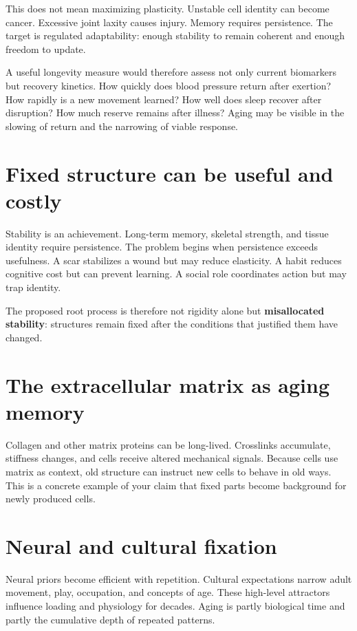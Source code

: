 This does not mean maximizing plasticity. Unstable cell identity can become cancer. Excessive joint laxity causes injury. Memory requires persistence. The target is regulated adaptability: enough stability to remain coherent and enough freedom to update.

A useful longevity measure would therefore assess not only current biomarkers but recovery kinetics. How quickly does blood pressure return after exertion? How rapidly is a new movement learned? How well does sleep recover after disruption? How much reserve remains after illness? Aging may be visible in the slowing of return and the narrowing of viable response.

\section{Fixed structure can be useful and costly}\label{fixed-structure-can-be-useful-and-costly}

Stability is an achievement. Long-term memory, skeletal strength, and tissue identity require persistence. The problem begins when persistence exceeds usefulness. A scar stabilizes a wound but may reduce elasticity. A habit reduces cognitive cost but can prevent learning. A social role coordinates action but may trap identity.

The proposed root process is therefore not rigidity alone but \textbf{misallocated stability}: structures remain fixed after the conditions that justified them have changed.

\section{The extracellular matrix as aging memory}\label{the-extracellular-matrix-as-aging-memory}

Collagen and other matrix proteins can be long-lived. Crosslinks accumulate, stiffness changes, and cells receive altered mechanical signals. Because cells use matrix as context, old structure can instruct new cells to behave in old ways. This is a concrete example of your claim that fixed parts become background for newly produced cells.

\section{Neural and cultural fixation}\label{neural-and-cultural-fixation}

Neural priors become efficient with repetition. Cultural expectations narrow adult movement, play, occupation, and concepts of age. These high-level attractors influence loading and physiology for decades. Aging is partly biological time and partly the cumulative depth of repeated patterns.
